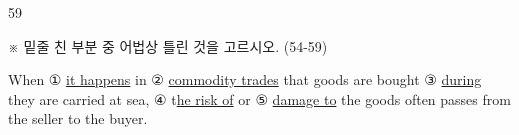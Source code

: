 \begin{question}{59}
\begin{framedtext}
※ 밑줄 친 부분 중 어법상 틀린 것을 고르시오. (54-59) \par
\end{framedtext}
When ① \uline{it happens} in ② \uline{commodity trades} that goods are bought ③ \uline{during} they are carried at sea, ④ t\uline{he risk of} or ⑤ \uline{damage to} the goods often passes from the seller to the buyer.
\end{question}
